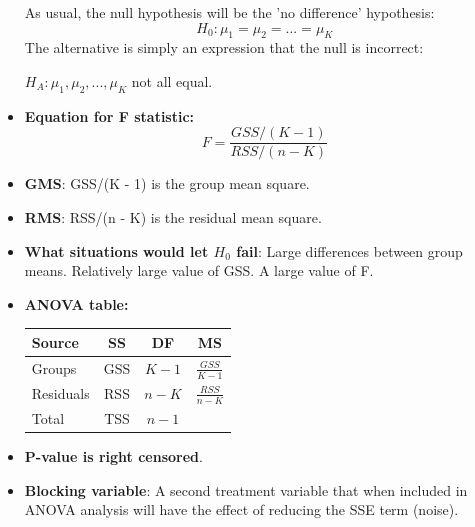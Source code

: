 \documentclass[12pt]{book}
\begin{document}
\begin{itemize}
As usual, the null hypothesis will be the 'no difference' hypothesis:
$$H_0: \mu_1=\mu_2=...=\mu_K$$
The alternative is simply an expression that the null is incorrect:

\centerline {$H_A:\mu_1, \mu_2, ..., \mu_K$ not all equal.}

\item \textbf{Equation for F statistic:}
$$F = \frac{GSS/(K-1)}{RSS/(n-K)}$$
\item \textbf{GMS}: GSS/(K - 1) is the group mean square.
\item \textbf{RMS}: RSS/(n - K) is the residual mean square.
\item \textbf{What situations would let $H_0$ fail}: Large differences between group means. Relatively large value of GSS. A large value of F.
\item \textbf{ANOVA table:}
\begin{table}[h]
\centering
\begin{tabular}{lccc}
\hline
Source & SS & DF & MS \\ \hline
Groups & GSS & $K - 1$ & $\frac{GSS}{K - 1}$ \\
Residuals & RSS & $n - K$ & $\frac{RSS}{n - K}$ \\ \hline
Total & TSS & $n - 1$ \\ \hline
\end{tabular}
\end{table}
\item \textbf{P-value is right censored}.
\item \textbf{Blocking variable}: A second treatment variable that when included in ANOVA analysis will have the effect of reducing the SSE term (noise).
\end{itemize}

\newpage
\thispagestyle{empty}
\mbox{}
\newpage
\end{document}

